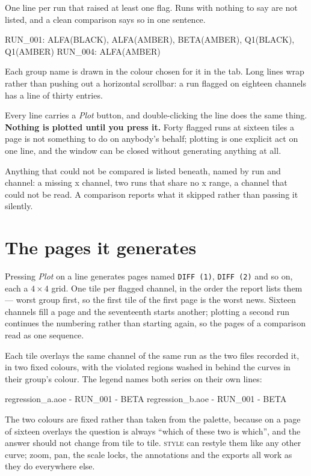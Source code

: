 \documentclass[11pt,a4paper,oneside]{report}
\newcommand{\code}[1]{\texttt{#1}}
\newcommand{\tab}[1]{\textsc{#1}}
\begin{document}
One line per run that raised at least one flag. Runs with nothing to say are
not listed, and a clean comparison says so in one sentence.

\begin{aoecode}
RUN_001: ALFA(BLACK), ALFA(AMBER), BETA(AMBER), Q1(BLACK), Q1(AMBER)
RUN_004: ALFA(AMBER)
\end{aoecode}

Each group name is drawn in the colour chosen for it in the tab. Long lines
wrap rather than pushing out a horizontal scrollbar: a run flagged on eighteen
channels has a line of thirty entries.

Every line carries a \emph{Plot} button, and double-clicking the line does the
same thing. \textbf{Nothing is plotted until you press it.} Forty flagged runs
at sixteen tiles a page is not something to do on anybody's behalf; plotting is
one explicit act on one line, and the window can be closed without generating
anything at all.

Anything that could not be compared is listed beneath, named by run and
channel: a missing x channel, two runs that share no x range, a channel that
could not be read. A comparison reports what it skipped rather than passing it
silently.

\section{The pages it generates}
\label{sec:diffpages}

Pressing \emph{Plot} on a line generates pages named \code{DIFF (1)},
\code{DIFF (2)} and so on, each a $4 \times 4$ grid. One tile per flagged
channel, in the order the report lists them --- worst group first, so the first
tile of the first page is the worst news. Sixteen channels fill a page and the
seventeenth starts another; plotting a second run continues the numbering
rather than starting again, so the pages of a comparison read as one sequence.

Each tile overlays the same channel of the same run as the two files recorded
it, in two fixed colours, with the violated regions washed in behind the curves
in their group's colour. The legend names both series on their own lines:

\begin{aoecode}
regression_a.aoe - RUN_001 - BETA
regression_b.aoe - RUN_001 - BETA
\end{aoecode}

The two colours are fixed rather than taken from the palette, because on a page
of sixteen overlays the question is always ``which of these two is which'', and
the answer should not change from tile to tile. \tab{style} can restyle them
like any other curve; zoom, pan, the scale locks, the annotations and the
exports all work as they do everywhere else.
\end{document}
